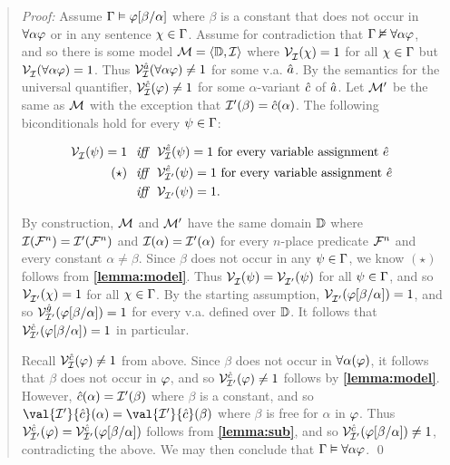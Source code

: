 \begin{quote} 
  \textit{Proof:} Assume $\Gamma \vDash \varphi[\beta/\alpha]$ where $\beta$ is a constant that does not occur in $\forall\alpha\varphi$ or in any sentence $\chi\in\Gamma$.
  Assume for contradiction that $\Gamma \nvDash \forall \alpha\varphi$, and so there is some model $\mathcal{M}=\langle\mathbb{D},\mathcal{I}\rangle$ where $\mathcal{V}_{\mathcal{I}}^{}(\chi) = 1$ for all $\chi \in \Gamma$ but $\mathcal{V}_{\mathcal{I}}^{}(\forall \alpha\varphi) = 1$.
  Thus $\mathcal{V}_{\mathcal{I}}^{\hat{a}}(\forall \alpha\varphi)\neq 1$ for some v.a. $\hat{a}$. 
  By the semantics for the universal quantifier, $\mathcal{V}_{\mathcal{I}}^{\hat{c}}(\varphi)\neq 1$ for some $\alpha$-variant $\hat{c}$ of $\hat{a}$.
  Let $\mathcal{M}'$ be the same as $\mathcal{M}$ with the exception that $\mathcal{I}'(\beta)=\hat{c}(\alpha)$.
  The following biconditionals hold for every $\psi \in \Gamma$:

  \vspace{-.2in}
  \begin{align*}
    \mathcal{V}_{\mathcal{I}}^{}(\psi)=1 &\textit{ ~iff~ } \mathcal{V}_{\mathcal{I}}^{\hat{e}}(\psi)=1 \text{ for every variable assignment } \hat{e}\\
     (\star) &\textit{ ~iff~ } \mathcal{V}_{\mathcal{I}'}^{\hat{e}}(\psi)=1 \text{ for every variable assignment } \hat{e}\\ 
     &\textit{ ~iff~ } \mathcal{V}_{\mathcal{I}'}^{}(\psi)=1.
  \end{align*}

  By construction, $\mathcal{M}$ and $\mathcal{M}'$ have the same domain $\mathbb{D}$ where $\mathcal{I}(\mathcal{F}^n)=\mathcal{I}'(\mathcal{F}^n)$ and $\mathcal{I}(\alpha)=\mathcal{I}'(\alpha)$ for every $n$-place predicate $\mathcal{F}^n$ and every constant $\alpha\neq\beta$.
  Since $\beta$ does not occur in any $\psi \in \Gamma$, we know $(\star)$ follows from \textbf{\ref{lemma:model}}.
  Thus $\mathcal{V}_{\mathcal{I}}^{}(\psi)=\mathcal{V}_{\mathcal{I}'}^{}(\psi)$ for all $\psi\in\Gamma$, and so $\mathcal{V}_{\mathcal{I}'}^{}(\chi) = 1$ for all $\chi \in \Gamma$.
  By the starting assumption, $\mathcal{V}_{\mathcal{I}'}^{}(\varphi[\beta/\alpha]) = 1$, and so $\mathcal{V}_{\mathcal{I}'}^{\hat{g}}(\varphi[\beta/\alpha])=1$ for every v.a. defined over $\mathbb{D}$.
  It follows that $\mathcal{V}_{\mathcal{I}'}^{\hat{c}}(\varphi[\beta/\alpha])=1$ in particular.

  Recall $\mathcal{V}_{\mathcal{I}}^{\hat{c}}(\varphi)\neq 1$ from above.
  Since $\beta$ does not occur in $\forall \alpha(\varphi)$, it follows that $\beta$ does not occur in $\varphi$, and so $\mathcal{V}_{\mathcal{I}'}^{\hat{c}}(\varphi)\neq 1$ follows by \textbf{\ref{lemma:model}}.
  However, $\hat{c}(\alpha)=\mathcal{I}'(\beta)$ where $\beta$ is a constant, and so $\val{\I'}{\va{c}}(\alpha)=\val{\I'}{\va{c}}(\beta)$ where $\beta$ is free for $\alpha$ in $\varphi$.
  Thus $\mathcal{V}_{\mathcal{I}'}^{\hat{c}}(\varphi)=\mathcal{V}_{\mathcal{I}'}^{\hat{c}}(\varphi[\beta/\alpha])$ follows from \textbf{\ref{lemma:sub}}, and so $\mathcal{V}_{\mathcal{I}'}^{\hat{c}}(\varphi[\beta/\alpha])\neq 1$, contradicting the above.
  We may then conclude that $\Gamma \vDash \forall \alpha\varphi$.
  \qed
\end{quote}

